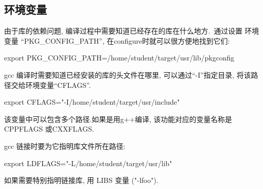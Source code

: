 \subsection{环境变量}
    由于库的依赖问题, 编译过程中需要知道已经存在的库在什么地方.~通过设置
环境变量 ``PKG\_CONFIG\_PATH'', 在configure时就可以很方便地找到它们:

    export PKG\_CONFIG\_PATH=/home/student/target/usr/lib/pkgconfig

    gcc 编译时需要知道已经安装的库的头文件在哪里, 可以通过``-I''指定目录,
将该路径交给环境变量``CFLAGS''.

    export CFLAGS="-I/home/student/target/usr/include"

    该变量中可以包含多个路径.如果是用g++编译, 该功能对应的变量名称是CPPFLAGS
或CXXFLAGS.\@

    gcc 链接时要为它指明库文件所在路径: 

    export LDFLAGS="-L/home/student/target/usr/lib"

    如果需要特别指明链接库, 用 LIBS 变量 ("-lfoo").
